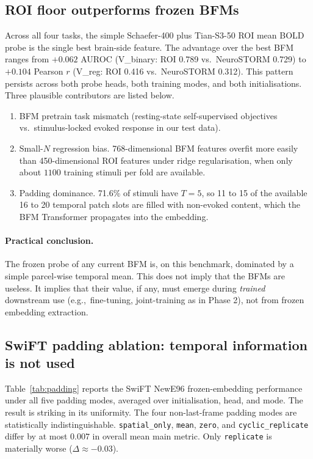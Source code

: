 \documentclass[11pt, a4paper]{article}
\newcommand{\eg}{e.g.,\ }
\begin{document}
\subsection{ROI floor outperforms frozen BFMs}

Across all four tasks, the simple Schaefer-400 plus Tian-S3-50 ROI mean BOLD probe is the
single best brain-side feature. The advantage over the best BFM ranges from $+0.062$
AUROC (V\_binary: ROI \num{0.789} vs.\ NeuroSTORM \num{0.729}) to $+0.104$ Pearson $r$
(V\_reg: ROI \num{0.416} vs.\ NeuroSTORM \num{0.312}). This pattern persists across both
probe heads, both training modes, and both initialisations. Three plausible contributors
are listed below.

\begin{enumerate}[leftmargin=1.4em, itemsep=1pt]
  \item BFM pretrain task mismatch (resting-state self-supervised objectives vs.\
        stimulus-locked evoked response in our test data).
  \item Small-$N$ regression bias. 768-dimensional BFM features overfit more easily than
        450-dimensional ROI features under ridge regularisation, when only about $1100$
        training stimuli per fold are available.
  \item Padding dominance. 71.6\% of stimuli have $T = 5$, so 11 to 15 of the available
        16 to 20 temporal patch slots are filled with non-evoked content, which the BFM
        Transformer propagates into the embedding.
\end{enumerate}

\paragraph{Practical conclusion.}
The frozen probe of any current BFM is, on this benchmark, dominated by a simple
parcel-wise temporal mean. This does not imply that the BFMs are useless. It implies that
their value, if any, must emerge during \emph{trained} downstream use (\eg fine-tuning,
joint-training as in Phase 2), not from frozen embedding extraction.

\subsection{SwiFT padding ablation: temporal information is not used}
\label{sec:padding-ablation}

Table~\ref{tab:padding} reports the SwiFT NewE96 frozen-embedding performance under all
five padding modes, averaged over initialisation, head, and mode. The result is striking
in its uniformity. The four non-last-frame padding modes are statistically
indistinguishable. \texttt{spatial\_only}, \texttt{mean}, \texttt{zero}, and
\texttt{cyclic\_replicate} differ by at most $0.007$ in overall mean main metric. Only
\texttt{replicate} is materially worse ($\Delta \approx -0.03$).
\end{document}
